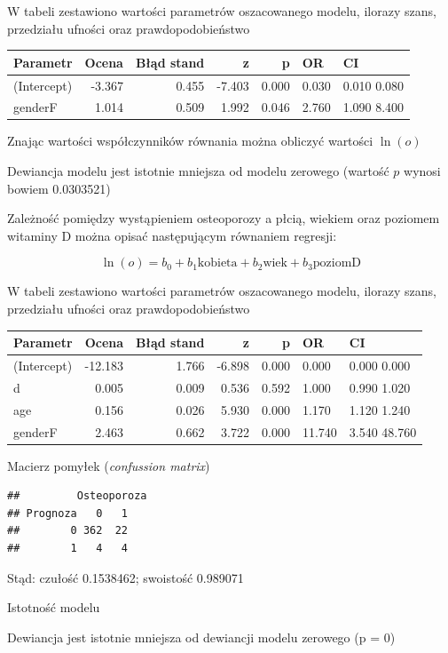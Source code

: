 \documentclass[
  openany]{book}
\begin{document}
\begin{example}
W tabeli zestawiono wartości parametrów oszacowanego modelu, ilorazy szans, przedziału ufności
oraz prawdopodobieństwo

\begin{tabular}{l|r|r|r|r|l|l}
\hline
Parametr & Ocena & Błąd stand & z & p & OR & CI\\
\hline
(Intercept) & -3.367 & 0.455 & -7.403 & 0.000 & 0.030 & 0.010 0.080\\
\hline
genderF & 1.014 & 0.509 & 1.992 & 0.046 & 2.760 & 1.090 8.400\\
\hline
\end{tabular}

Znając wartości współczynników równania można obliczyć wartości \(\ln(o)\)

Dewiancja modelu jest istotnie mniejsza od modelu zerowego (wartość \(p\) wynosi bowiem 0.0303521)

Zależność pomiędzy wystąpieniem osteoporozy a płcią, wiekiem oraz poziomem witaminy D
można opisać następującym równaniem regresji:

\[\ln(o) = b_0 + b_1 \textrm{kobieta} + b_2 \textrm{wiek} + b_3 \textrm{poziomD}\]

W tabeli zestawiono wartości parametrów oszacowanego modelu, ilorazy szans, przedziału ufności
oraz prawdopodobieństwo

\begin{tabular}{l|r|r|r|r|l|l}
\hline
Parametr & Ocena & Błąd stand & z & p & OR & CI\\
\hline
(Intercept) & -12.183 & 1.766 & -6.898 & 0.000 & 0.000 & 0.000 0.000\\
\hline
d & 0.005 & 0.009 & 0.536 & 0.592 & 1.000 & 0.990 1.020\\
\hline
age & 0.156 & 0.026 & 5.930 & 0.000 & 1.170 & 1.120 1.240\\
\hline
genderF & 2.463 & 0.662 & 3.722 & 0.000 & 11.740 & 3.540 48.760\\
\hline
\end{tabular}

Macierz pomyłek (\emph{confussion matrix})

\begin{verbatim}
##         Osteoporoza
## Prognoza   0   1
##        0 362  22
##        1   4   4
\end{verbatim}

Stąd: czułość 0.1538462; swoistość 0.989071

Istotność modelu

Dewiancja jest istotnie mniejsza od dewiancji modelu zerowego (p = 0)


\end{example}
\end{document}
